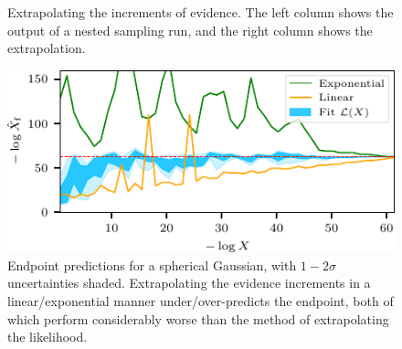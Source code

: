\documentclass[usenatbib]{mnras}
\begin{document}
\begin{figure}
\begin{adjustbox}{valign=t, scale=0.72}
\end{adjustbox}
\quad
\begin{adjustbox}{valign=t}
\end{adjustbox}
\caption{Extrapolating the increments of evidence. The left column shows the output of a nested sampling run, and the right column shows the extrapolation.}
\label{fig:inc_extrapolate}
\end{figure}
\begin{figure}
\includegraphics{figures/inc_predictions.pdf}
\caption{Endpoint predictions for a spherical Gaussian, with $1-2\sigma$ uncertainties shaded. Extrapolating the evidence increments in a linear/exponential manner under/over-predicts the endpoint, both of which perform considerably worse than the method of extrapolating the likelihood.}
\label{fig:inc_predictions}
\end{figure}
\end{document}
